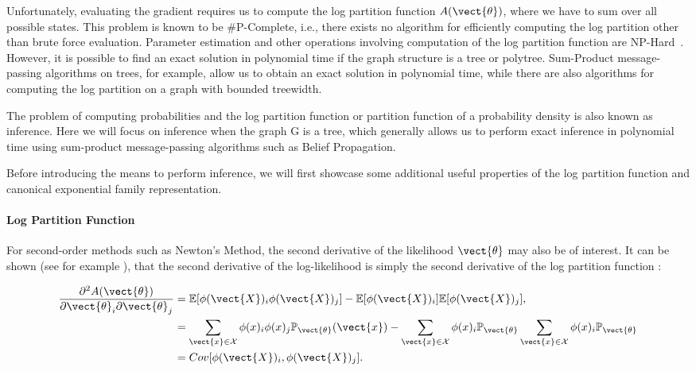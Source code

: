     Unfortunately, evaluating the gradient requires us to compute the log partition function $A(\vect{\theta})$, where we have to sum over all possible states.
    This problem is known to be \#P-Complete, i.e., there exists no algorithm for efficiently computing the log partition other than brute force evaluation.
    Parameter estimation and other operations involving computation of the log partition function are NP-Hard~\cite{cooper1990computational}.
    However, it is possible to find an exact solution in polynomial time if the graph structure is a tree or polytree.
    Sum-Product message-passing algorithms on trees, for example, allow us to obtain an exact solution in polynomial time, while there are also algorithms for computing the log partition on a graph with bounded treewidth\cite{berg2014learning}.

    The problem of computing probabilities and the log partition function or partition function of a probability density is also known as inference.
    Here we will focus on inference when the graph G is a tree, which generally allows us to perform exact inference in polynomial time using sum-product message-passing algorithms such as Belief Propagation.

    Before introducing the means to perform inference, we will first showcase some additional useful properties of the log partition function and canonical exponential family representation.
    
    \paragraph*{Log Partition Function}
    For second-order methods such as Newton's Method, the second derivative of the likelihood \wrt $\vect{\theta}$ may also be of interest.
    It can be shown (see for example \cite{piatkowski2018exponential}), that the second derivative of the log-likelihood is simply the second derivative of the log partition function :

    \begin{equation}
        \label{eq:sparsefish}
        \begin{split}
        \frac{\partial^2 A(\vect{\theta})}{\partial \vect{\theta}_i \partial \vect{\theta}_j} &= \mathbb{E}[\phi(\vect{X})_i \phi(\vect{X})_j] - \mathbb{E}[\phi(\vect{X})_i] \mathbb{E}[\phi(\vect{X})_j], \\
        &= \sum_{\vect{x} \in \mathcal{X}} \phi(x)_i \phi(x)_j \mathbb{P}_{\vect{\theta}}(\vect{x}) - \sum_{\vect{x} \in \mathcal{X}} \phi(x)_i \mathbb{P}_{\vect{\theta}} \sum_{\vect{x} \in \mathcal{X}} \phi(x)_i  \mathbb{P}_{\vect{\theta}} \\
        &= Cov[\phi(\vect{X})_i, \phi(\vect{X})_j].
        \end{split}
    \end{equation}

